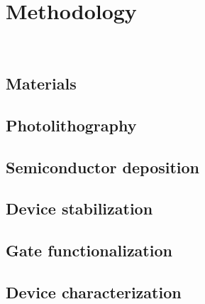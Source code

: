 \chapter{Methodology}
\label{cap:MatsMets}

\newpage
\thispagestyle{empty}
\ %
\newpage

\section{Materials} 
\label{sec:materials}




\section{Photolithography} 
\label{sec:lithography}




\section{Semiconductor deposition}
\label{sec:semiconductorDeposition}




\section{Device stabilization}
\label{sec:membrane_stabilization}




\section{Gate functionalization} 
\label{sec:functionalization}




\section{Device characterization}
\label{sec:characterization}




\newpage
\thispagestyle{empty}
\ %
\newpage